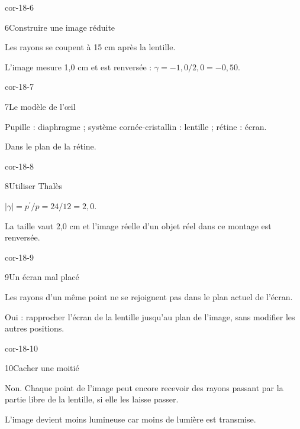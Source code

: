 \begin{blocLivre}{cor-18-6}\begin{corrige}{6}{Construire une image réduite}
\begin{questions}
\item Les rayons se coupent à 15 cm après la lentille.
\item L’image mesure 1,0 cm et est renversée : $\gamma=-1,0/2,0=-0,50$.
\end{questions}
\end{corrige}\end{blocLivre}
\begin{blocLivre}{cor-18-7}\begin{corrige}{7}{Le modèle de l’œil}
\begin{questions}
\item Pupille : diaphragme ; système cornée-cristallin : lentille ; rétine : écran.
\item Dans le plan de la rétine.
\end{questions}
\end{corrige}\end{blocLivre}
\begin{blocLivre}{cor-18-8}\begin{corrige}{8}{Utiliser Thalès}
\begin{questions}
\item $|\gamma|=p^{\prime}/p=24/12=2,0$.
\item La taille vaut 2,0 cm et l’image réelle d’un objet réel dans ce montage est renversée.
\end{questions}
\end{corrige}\end{blocLivre}
\begin{blocLivre}{cor-18-9}\begin{corrige}{9}{Un écran mal placé}
\begin{questions}
\item Les rayons d’un même point ne se rejoignent pas dans le plan actuel de l’écran.
\item Oui : rapprocher l’écran de la lentille jusqu’au plan de l’image, sans modifier les autres positions.
\end{questions}
\end{corrige}\end{blocLivre}
\begin{blocLivre}{cor-18-10}\begin{corrige}{10}{Cacher une moitié}
\begin{questions}
\item Non. Chaque point de l’image peut encore recevoir des rayons passant par la partie libre de la lentille, si elle les laisse passer.
\item L’image devient moins lumineuse car moins de lumière est transmise.
\end{questions}
\end{corrige}\end{blocLivre}
